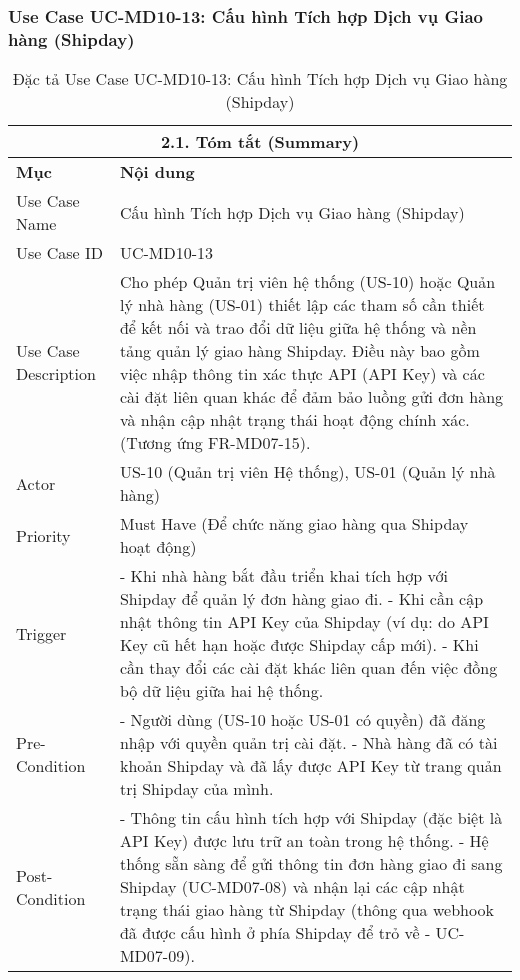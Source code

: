 \subsubsection{Use Case UC-MD10-13: Cấu hình Tích hợp Dịch vụ Giao hàng (Shipday)}
\begin{longtable}{|m{4cm}|p{11cm}|}
\caption{Đặc tả Use Case UC-MD10-13: Cấu hình Tích hợp Dịch vụ Giao hàng (Shipday)} \label{tab:uc_md10_13_full_v2_latex_fixed_in_codeblock} \\
\hline
\multicolumn{2}{|c|}{\textbf{2.1. Tóm tắt (Summary)}} \\
\hline
\textbf{Mục} & \textbf{Nội dung} \\
\hline
\endhead %
\midrule
\endfoot %
\bottomrule
\endlastfoot %
Use Case Name & Cấu hình Tích hợp Dịch vụ Giao hàng (Shipday) \\
\hline
Use Case ID & UC-MD10-13 \\
\hline
Use Case Description & Cho phép Quản trị viên hệ thống (US-10) hoặc Quản lý nhà hàng (US-01) thiết lập các tham số cần thiết để kết nối và trao đổi dữ liệu giữa hệ thống và nền tảng quản lý giao hàng Shipday. Điều này bao gồm việc nhập thông tin xác thực API (API Key) và các cài đặt liên quan khác để đảm bảo luồng gửi đơn hàng và nhận cập nhật trạng thái hoạt động chính xác. (Tương ứng FR-MD07-15). \\
\hline
Actor & US-10 (Quản trị viên Hệ thống), US-01 (Quản lý nhà hàng) \\
\hline
Priority & Must Have (Để chức năng giao hàng qua Shipday hoạt động) \\
\hline
Trigger & - Khi nhà hàng bắt đầu triển khai tích hợp với Shipday để quản lý đơn hàng giao đi. \newline - Khi cần cập nhật thông tin API Key của Shipday (ví dụ: do API Key cũ hết hạn hoặc được Shipday cấp mới). \newline - Khi cần thay đổi các cài đặt khác liên quan đến việc đồng bộ dữ liệu giữa hai hệ thống. \\
\hline
Pre-Condition & - Người dùng (US-10 hoặc US-01 có quyền) đã đăng nhập với quyền quản trị cài đặt. \newline - Nhà hàng đã có tài khoản Shipday và đã lấy được API Key từ trang quản trị Shipday của mình. \\
\hline
Post-Condition & - Thông tin cấu hình tích hợp với Shipday (đặc biệt là API Key) được lưu trữ an toàn trong hệ thống. \newline - Hệ thống sẵn sàng để gửi thông tin đơn hàng giao đi sang Shipday (UC-MD07-08) và nhận lại các cập nhật trạng thái giao hàng từ Shipday (thông qua webhook đã được cấu hình ở phía Shipday để trỏ về - UC-MD07-09). \\

\end{longtable}
